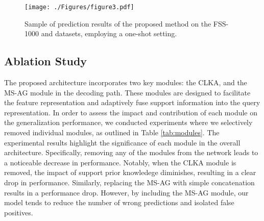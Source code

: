 \documentclass[runningheads]{llncs}
\begin{document}
\begin{figure}[!th]
    \centering
    \texttt{[image: ./Figures/figure3.pdf]}
    \caption{Sample of prediction results of the proposed method on the FSS-1000 and  datasets, employing a one-shot setting.}
    \label{fig:results}
\end{figure} 

\subsection{Ablation Study}
The proposed architecture incorporates two key modules: the CLKA, and the MS-AG module in the decoding path. These modules are designed to facilitate the feature representation and adaptively fuse support information into the query representation. In order to assess the impact and contribution of each module on the generalization performance, we conducted experiments where we selectively removed individual modules, as outlined in Table \ref{tab:modules}.
The experimental results highlight the significance of each module in the overall architecture. Specifically, removing any of the modules from the network leads to a noticeable decrease in performance. Notably, when the CLKA module is removed, the impact of support prior knowledege diminishes, resulting in a clear drop in performance. Similarly, replacing the MS-AG with simple concatenation results in a performance drop. However, by including the MS-AG module, our model tends to reduce the number of wrong predictions and isolated false positives.
\end{document}
